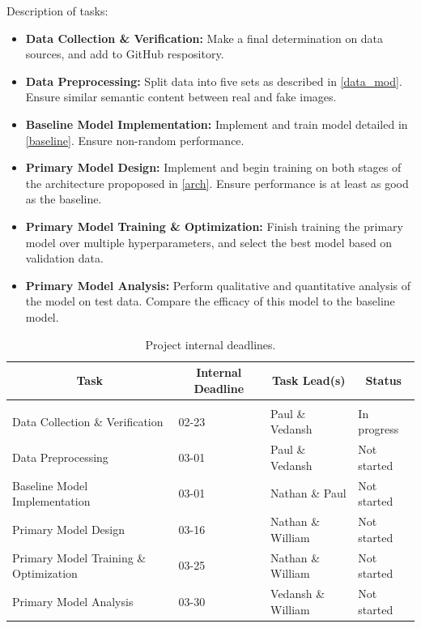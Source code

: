 \documentclass{article} %
\begin{document}
Description of tasks:
\begin{itemize}
        \item \textbf{Data Collection \& Verification:} Make a final determination on data sources, and add to GitHub respository.
        \item \textbf{Data Preprocessing:}              Split data into five sets as described in \ref{data_mod}. Ensure similar semantic content between real and fake images. 
        \item \textbf{Baseline Model Implementation:}   Implement and train model detailed in \ref{baseline}. Ensure non-random performance.
        \item \textbf{Primary Model Design:}            Implement and begin training on both stages of the architecture propoposed in \ref{arch}. Ensure performance is at least as good as the baseline.
        \item \textbf{Primary Model Training \& Optimization:} Finish training the primary model over multiple hyperparameters, and select the best model based on validation data.
        \item \textbf{Primary Model Analysis:}          Perform qualitative and quantitative analysis of the model on test data. Compare the efficacy of this model to the baseline model.
\end{itemize}

    \begin{table}[t]
    \caption{Project internal deadlines.}
    \label{plan_table}
    \begin{center}
    \begin{tabular}{llll}
    \multicolumn{1}{c}{\bf Task}            & \multicolumn{1}{c}{\bf Internal Deadline} & \multicolumn{1}{c}{\bf Task Lead(s)} & \multicolumn{1}{c}{\bf Status}
    \\ \hline \\
    Data Collection \& Verification         & 02-23                                     & Paul \& Vedansh       & In progress \\
    Data Preprocessing                      & 03-01                                     & Paul \& Vedansh       & Not started \\
    Baseline Model Implementation           & 03-01                                     & Nathan \& Paul        & Not started \\                   
    Primary Model Design                    & 03-16                                     & Nathan \& William     & Not started  \\
    Primary Model Training \& Optimization  & 03-25                                     & Nathan \& William     & Not started  \\
    Primary Model Analysis                  & 03-30                                     & Vedansh \& William    & Not started  \\
    \end{tabular}
    \end{center}
    \end{table}
    
\end{document}
